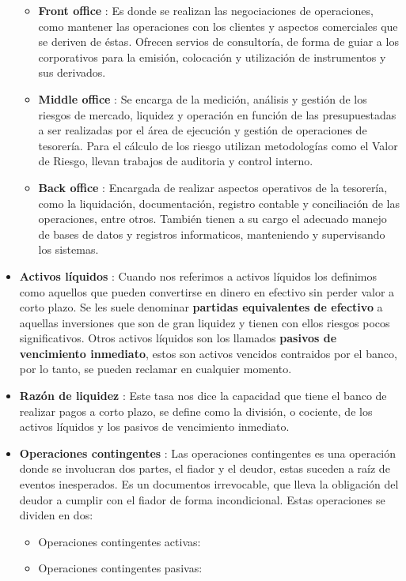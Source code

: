 \documentclass[10pt,]{article}
\providecommand{\tightlist}{%
  \setlength{\itemsep}{0pt}\setlength{\parskip}{0pt}}
\begin{document}
\begin{itemize}
  \begin{itemize}
  \item
    \textbf{Front office} : Es donde se realizan las negociaciones de
    operaciones, como mantener las operaciones con los clientes y
    aspectos comerciales que se deriven de éstas. Ofrecen servios de
    consultoría, de forma de guiar a los corporativos para la emisión,
    colocación y utilización de instrumentos y sus derivados.
  \item
    \textbf{Middle office} : Se encarga de la medición, análisis y
    gestión de los riesgos de mercado, liquidez y operación en función
    de las presupuestadas a ser realizadas por el área de ejecución y
    gestión de operaciones de tesorería. Para el cálculo de los riesgo
    utilizan metodologías como el Valor de Riesgo, llevan trabajos de
    auditoria y control interno.
  \item
    \textbf{Back office} : Encargada de realizar aspectos operativos de
    la tesorería, como la liquidación, documentación, registro contable
    y conciliación de las operaciones, entre otros. También tienen a su
    cargo el adecuado manejo de bases de datos y registros informaticos,
    manteniendo y supervisando los sistemas.
  \end{itemize}
\item
  \textbf{Activos líquidos} : Cuando nos referimos a activos líquidos
  los definimos como aquellos que pueden convertirse en dinero en
  efectivo sin perder valor a corto plazo. Se les suele denominar
  \textbf{partidas equivalentes de efectivo} a aquellas inversiones que
  son de gran liquidez y tienen con ellos riesgos pocos significativos.
  Otros activos líquidos son los llamados \textbf{pasivos de vencimiento
  inmediato}, estos son activos vencidos contraidos por el banco, por lo
  tanto, se pueden reclamar en cualquier momento.
\item
  \textbf{Razón de liquidez} : Este tasa nos dice la capacidad que tiene
  el banco de realizar pagos a corto plazo, se define como la división,
  o cociente, de los activos líquidos y los pasivos de vencimiento
  inmediato.
\item
  \textbf{Operaciones contingentes} : Las operaciones contingentes es
  una operación donde se involucran dos partes, el fiador y el deudor,
  estas suceden a raíz de eventos inesperados. Es un documentos
  irrevocable, que lleva la obligación del deudor a cumplir con el
  fiador de forma incondicional. Estas operaciones se dividen en dos:

  \begin{itemize}
  \tightlist
  \item
    Operaciones contingentes activas:
  \item
    Operaciones contingentes pasivas:
  \end{itemize}
\end{itemize}
\end{document}
